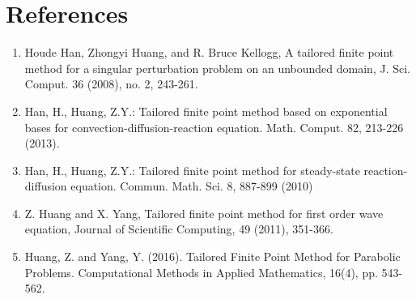 
\chapter*{References} %


\begin{enumerate}
 \item Houde Han, Zhongyi Huang, and R. Bruce Kellogg, A tailored finite point method for a
singular perturbation problem on an unbounded domain, J. Sci. Comput. 36 (2008), no. 2,
243-261.
\item Han, H., Huang, Z.Y.: Tailored finite point method based on exponential bases for
convection-diffusion-reaction equation. Math. Comput. 82, 213-226 (2013).
\item Han, H., Huang, Z.Y.: Tailored finite point method for steady-state reaction-diffusion
equation. Commun. Math. Sci. 8, 887-899 (2010)
\item Z. Huang and X. Yang, Tailored finite point method for first order wave equation, Journal of
Scientific Computing, 49 (2011), 351-366.
\item Huang, Z. and Yang, Y. (2016). Tailored Finite Point Method for Parabolic Problems. Computational Methods in Applied Mathematics, 
16(4), pp. 543-562.
\end{enumerate}



